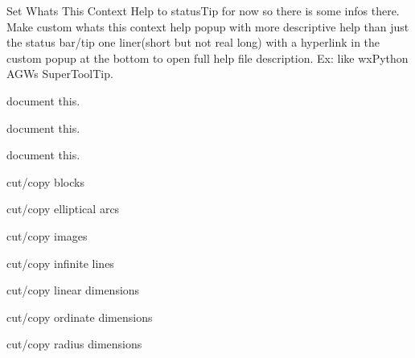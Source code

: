 \begin{DoxyRefList}
\label{todo__todo000196}%
%
Set What\textquotesingle{}s This Context Help to status\+Tip for now so there is some infos there. Make custom whats this context help popup with more descriptive help than just the status bar/tip one liner(short but not real long) with a hyperlink in the custom popup at the bottom to open full help file description. Ex\+: like wx\+Python AGW\textquotesingle{}s Super\+Tool\+Tip. 
\item[Member \mbox{\hyperlink{imgui__main_8c_af3a1ec0a097fd17ed8066a9998940704}{create\+Grid\+Iso}} (void)]\label{todo__todo000046}%
%
document this.  
\item[Member \mbox{\hyperlink{imgui__main_8c_a990d2f3521e68827189eb1ea7ea49153}{create\+Grid\+Polar}} (void)]\label{todo__todo000045}%
%
document this.  
\item[Member \mbox{\hyperlink{imgui__main_8c_a1ef382b5c1b396c2d228932d2ea3c2ef}{create\+Grid\+Rect}} (void)]\label{todo__todo000044}%
%
document this.  
\item[Member \mbox{\hyperlink{imgui__main_8c_adce5db5dd1e8ab7e28b2908953bed991}{create\+Object\+List}} (Emb\+Array $\ast$list)]\label{todo__todo000057}%
%
cut/copy blocks

\label{todo__todo000059}%
%
cut/copy elliptical arcs

\label{todo__todo000060}%
%
cut/copy images

\label{todo__todo000061}%
%
cut/copy infinite lines

\label{todo__todo000062}%
%
cut/copy linear dimensions

\label{todo__todo000063}%
%
cut/copy ordinate dimensions

\label{todo__todo000064}%
%
cut/copy radius dimensions 


\end{DoxyRefList}
